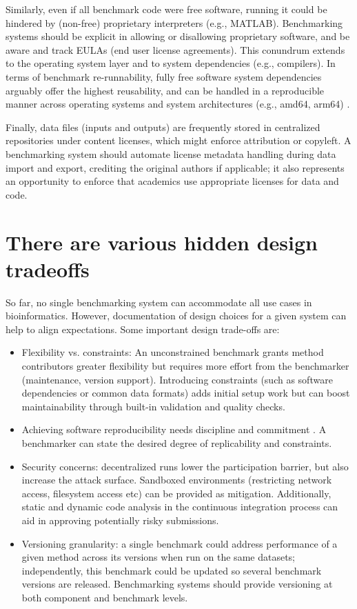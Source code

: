 \documentclass[11pt]{article}
\begin{document}

Similarly, even if all benchmark code were free software, running it could be hindered by (non-free) proprietary interpreters (e.g., MATLAB). Benchmarking systems should be explicit in allowing or disallowing proprietary software, and be aware and track EULAs (end user license agreements). This conundrum extends to the operating system layer and to system dependencies (e.g., compilers). In terms of benchmark re-runnability, fully free software system dependencies arguably offer the highest reusability, and can be handled in a reproducible manner across operating systems and system architectures (e.g., amd64, arm64) \cite{droge2023-ax}.

Finally, data files (inputs and outputs) are frequently stored in centralized repositories \cite{Potter2015-fs, Sicilia2017-ko, van-de-Sandt2019-wd} under content licenses, which might enforce attribution or copyleft. A benchmarking system should automate license metadata handling during data import and export, crediting the original authors if applicable; it also represents an opportunity to enforce that academics use appropriate licenses for data and code. 


\section*{There are various hidden design tradeoffs}

So far, no single benchmarking system can accommodate all use cases in bioinformatics. However, documentation of design choices for a given system can help to align expectations. Some important design trade-offs are:

\begin{itemize}
    \item Flexibility vs. constraints:  An unconstrained benchmark grants method contributors greater flexibility but requires more effort from the benchmarker (maintenance, version support). Introducing constraints (such as software dependencies or common data formats) adds initial setup work but can boost maintainability through built-in validation and quality checks.
    \item  Achieving software reproducibility needs discipline and commitment \cite{Lamb2021-tb}. A benchmarker can state the desired degree of replicability and constraints. 
    \item  Security concerns: decentralized runs lower the participation barrier, but also increase the attack  surface. Sandboxed environments (restricting network access, filesystem access etc) can be provided as mitigation. Additionally, static and dynamic code analysis in the continuous integration process can aid in approving potentially risky submissions.
    \item Versioning granularity: a single benchmark could address performance of a given method across its versions when run on the same datasets; independently, this benchmark could be updated so several benchmark versions are released. Benchmarking systems should provide versioning at both component and benchmark levels.
\end{itemize}
\end{document}
